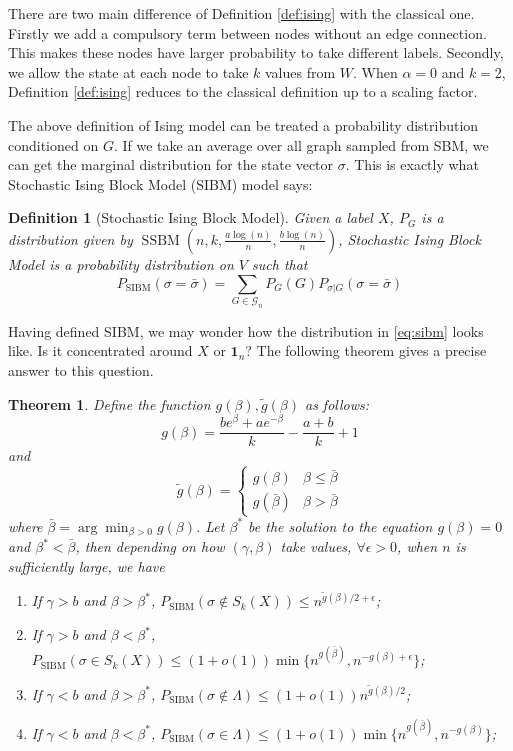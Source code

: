 \documentclass[journal]{IEEEtran}
\newtheorem{theorem}{Theorem}
\newtheorem{definition}{Definition}
\newcommand{\A}{\frac{a \log(n)}{n}}
\newcommand{\B}{\frac{b \log(n)}{n}}
\newcommand{\cG}{\mathcal{G}}
\DeclareMathOperator{\SSBM}{SSBM}
\DeclareMathOperator{\SIBM}{SIBM}
\begin{document}
There are two main difference of Definition \ref{def:ising} with the classical one. Firstly we add a compulsory term
between nodes without an edge connection. This makes these nodes have larger probability to take different labels.
Secondly, we allow the state at each node to take $k$ values from $W$.
When $\alpha = 0$ and $k=2$, Definition \ref{def:ising}
reduces to the classical definition up to a scaling factor.

The above definition of Ising model can be treated a probability distribution conditioned on $G$.
If we take an average over all graph sampled from SBM, we can get the marginal distribution for the state vector $\sigma$.
This is exactly what Stochastic Ising Block Model (SIBM) model says:
\begin{definition}[Stochastic Ising Block Model]
	Given a label $X$, $P_G$ is a distribution given by $\SSBM(n,k,\A,\B)$, Stochastic Ising Block Model
	is a probability distribution on $V$ such that
\begin{equation}\label{eq:sibm}
P_{\SIBM}(\sigma = \bar{\sigma}) = \sum_{G \in \cG_n} P_G(G) P_{\sigma | G}(\sigma = \bar{\sigma}) 
\end{equation}
\end{definition}
Having defined SIBM, we may wonder how the distribution in \eqref{eq:sibm} looks like. Is it concentrated around $X$ or
$\mathbf{1}_n$? The following theorem gives a precise answer to this question.
\begin{theorem}\label{thm:phase_transition}
Define the function $g(\beta), \tilde{g}(\beta)$ as follows:
\begin{equation}
g(\beta) = \frac{be^{\beta} + a e^{-\beta}}{k} - \frac{a+b}{k} +1
\end{equation}
and
\begin{equation}
\tilde{g}(\beta) = \begin{cases}
g(\beta) & \beta \leq \bar{\beta} \\
g(\bar{\beta}) & \beta > \bar{\beta}
\end{cases}
\end{equation}
where $\bar{\beta} =  \arg\min_{\beta > 0} g(\beta)$.
Let $\beta^*$ be the solution to the equation $g(\beta) = 0$ and $\beta^* < \bar{\beta}$, then depending on
how $(\gamma, \beta)$ take values, $\forall \epsilon > 0$, when $n$ is sufficiently large, we have
\begin{enumerate}
\item If $\gamma > b$ and $\beta > \beta^*$,  $P_{\SIBM}(\sigma \not\in S_k(X)) \leq n^{\tilde{g}(\beta)/2 + \epsilon}$;
\item If $\gamma > b$ and $\beta < \beta^*$, $P_{\SIBM}(\sigma \in S_k(X)) \leq (1+o(1))\min\{n^{g(\bar{\beta})},
n^{-g(\beta)+ \epsilon} \}$;
\item If $\gamma < b$ and $\beta > \beta^*$, $P_{\SIBM}(\sigma \not\in \Lambda) \leq (1+o(1))n^{\tilde{g}(\beta)/2}$;
\item If $\gamma < b$ and $\beta < \beta^*$, $P_{\SIBM}(\sigma \in \Lambda) \leq (1+o(1))\min\{n^{g(\bar{\beta})},
n^{-g(\beta)} \}$;
\end{enumerate}
\end{theorem}
\end{document}
